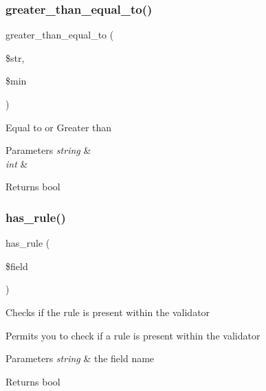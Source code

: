 \subsubsection{\texorpdfstring{greater\+\_\+than\+\_\+equal\+\_\+to()}{greater\_than\_equal\_to()}}
{\footnotesize\ttfamily greater\+\_\+than\+\_\+equal\+\_\+to (\begin{DoxyParamCaption}\item[{}]{\$str,  }\item[{}]{\$min }\end{DoxyParamCaption})}

Equal to or Greater than


\begin{DoxyParams}{Parameters}
{\em string} & \\
\hline
{\em int} & \\
\hline
\end{DoxyParams}
\begin{DoxyReturn}{Returns}
bool 
\end{DoxyReturn}
\mbox{\label{class_c_i___form__validation_aaf0ef71d3e9ac390f52441f27e4b7786}} 
\subsubsection{\texorpdfstring{has\+\_\+rule()}{has\_rule()}}
{\footnotesize\ttfamily has\+\_\+rule (\begin{DoxyParamCaption}\item[{}]{\$field }\end{DoxyParamCaption})}

Checks if the rule is present within the validator

Permits you to check if a rule is present within the validator


\begin{DoxyParams}{Parameters}
{\em string} & the field name \\
\hline
\end{DoxyParams}
\begin{DoxyReturn}{Returns}
bool 
\end{DoxyReturn}
\mbox{\label{class_c_i___form__validation_a27365f05674ed5c959747000113f29aa}} 
